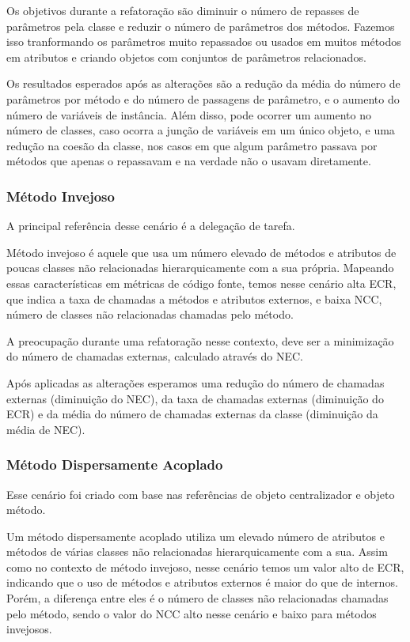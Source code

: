 	Os objetivos durante a refatoração são diminuir o número de repasses de parâmetros pela classe e reduzir o número de parâmetros dos métodos. Fazemos isso tranformando os parâmetros muito repassados ou usados em muitos métodos em atributos e criando objetos com conjuntos de parâmetros relacionados.
	
	Os resultados esperados após as alterações são a redução da média do número de parâmetros por método e do número de passagens de parâmetro, e o aumento do número de variáveis de instância. Além disso, pode ocorrer um aumento no número de classes, caso ocorra a junção de variáveis em um único objeto, e uma redução na coesão da classe, nos casos em que algum parâmetro passava por métodos que apenas o repassavam e na verdade não o usavam diretamente.
	
	


\subsubsection{Método Invejoso}

	A principal referência desse cenário é a delegação de tarefa.
	
	Método invejoso é aquele que usa um número elevado de métodos e atributos de poucas classes não relacionadas hierarquicamente com a sua própria. Mapeando essas características em métricas de código fonte, temos nesse cenário alta ECR, que indica a taxa de chamadas a métodos e atributos externos, e baixa NCC, número de classes não relacionadas chamadas pelo método.
	
	A preocupação durante uma refatoração nesse contexto, deve ser a minimização do número de chamadas externas, calculado através do NEC.
	
	Após aplicadas as alterações esperamos uma redução do número de chamadas externas (diminuição do NEC), da taxa de chamadas externas (diminuição do ECR) e  da média do número de chamadas externas da classe (diminuição da média de NEC).



\subsubsection{Método Dispersamente Acoplado}

	Esse cenário foi criado com base nas referências de objeto centralizador e objeto método.
	
	Um método dispersamente acoplado utiliza um elevado número de atributos e métodos de várias classes não relacionadas hierarquicamente com a sua. Assim como no contexto de método invejoso, nesse cenário temos um valor alto de ECR, indicando que o uso de métodos e atributos externos é maior do que de internos. Porém, a diferença entre eles é o número de classes não relacionadas chamadas pelo método, sendo o valor do NCC alto nesse cenário e baixo para métodos invejosos.
	
